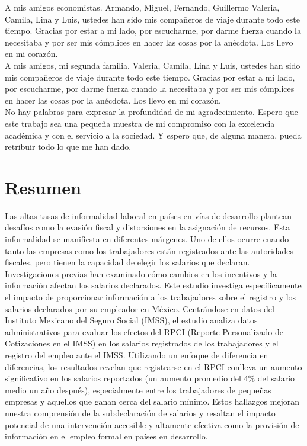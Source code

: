 \documentclass[10pt, oneside]{book}
\begin{document}
\noindent A mis amigos economistas. Armando, Miguel, Fernando, Guillermo Valeria, Camila, Lina y Luis, ustedes han sido mis compañeros de viaje durante todo este tiempo. Gracias por estar a mi lado, por escucharme, por darme fuerza cuando la necesitaba y por ser mis cómplices en hacer las cosas por la anécdota. Los llevo en mi corazón. \\

\noindent A mis amigos, mi segunda familia. Valeria, Camila, Lina y Luis, ustedes han sido mis compañeros de viaje durante todo este tiempo. Gracias por estar a mi lado, por escucharme, por darme fuerza cuando la necesitaba y por ser mis cómplices en hacer las cosas por la anécdota. Los llevo en mi corazón. \\

\noindent No hay palabras para expresar la profundidad de mi agradecimiento. Espero que este trabajo sea una pequeña muestra de mi compromiso con la excelencia académica y con el servicio a la sociedad. Y espero que, de alguna manera, pueda retribuir todo lo que me han dado.


\chapter*{Resumen}

\noindent Las altas tasas de informalidad laboral en países en vías de desarrollo plantean desafíos como la evasión fiscal y distorsiones en la asignación de recursos. Esta informalidad se manifiesta en diferentes márgenes. Uno de ellos ocurre cuando tanto las empresas como los trabajadores están registrados ante las autoridades fiscales, pero tienen la capacidad de elegir los salarios que declaran. Investigaciones previas han examinado cómo cambios en los incentivos y la información afectan los salarios declarados. Este estudio investiga específicamente el impacto de proporcionar información a los trabajadores sobre el registro y los salarios declarados por su empleador en México. Centrándose en datos del Instituto Mexicano del Seguro Social (IMSS), el estudio analiza datos administrativos para evaluar los efectos del RPCI (Reporte Personalizado de Cotizaciones en el IMSS) en los salarios registrados de los trabajadores y el registro del empleo ante el IMSS. Utilizando un enfoque de diferencia en diferencias, los resultados revelan que registrarse en el RPCI conlleva un aumento significativo en los salarios reportados (un aumento promedio del 4\% del salario medio un año después), especialmente entre los trabajadores de pequeñas empresas y aquellos que ganan cerca del salario mínimo. Estos hallazgos mejoran nuestra comprensión de la subdeclaración de salarios y resaltan el impacto potencial de una intervención accesible y altamente efectiva como la provisión de información en el empleo formal en países en desarrollo.
\end{document}
